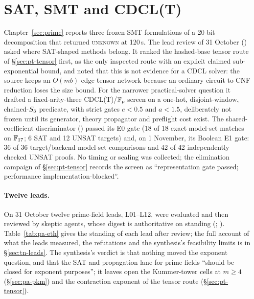 \section{SAT, SMT and CDCL(T)}\label{sec:pa-sat}

Chapter~\ref{sec:prime} reports three frozen SMT formulations of a 20-bit
decomposition that returned \textsc{unknown} at 120\,s. The lead review of
31 October () asked where
SAT-shaped methods belong. It ranked the hashed-base tensor route of
\S\ref{sec:pt-tensor} first, as the only inspected route with an explicit
claimed sub-exponential bound, and noted that this is not evidence for a
CDCL solver: the source keeps an $O(mb)$-edge tensor network because an
ordinary circuit-to-CNF reduction loses the size bound. For the narrower
practical-solver question it drafted a fixed-arity-three CDCL(T)/$\mathbb{F}_p$
screen on a one-hot, disjoint-window, chained-$S_{3}$ predicate, with
strict gates $e<0.5$ and $a<1.5$, deliberately not frozen until its
generator, theory propagator and preflight cost exist. The shared-coefficient
discriminator () passed
its E0 gate (18 of 18 exact model-set matches on $\mathbb{F}_{17}$; 6 SAT and 12
UNSAT targets) and, on 1 November, its Boolean E1 gate: 36 of 36
target/backend model-set comparisons and 42 of 42 independently checked
UNSAT proofs. No timing or scaling was collected; the elimination campaign
of \S\ref{sec:pt-tensor} records the screen as
``representation gate passed; performance implementation-blocked''.

\paragraph{Twelve leads.} On 31 October twelve prime-field leads, L01--L12,
were evaluated and then reviewed by skeptic agents, whose digest is
authoritative on standing (;
).
Table~\ref{tab:pa-eth} gives the standing of each lead after review; the
full account of what the leads measured, the refutations and the
synthesis's feasibility limits is in \S\ref{sec:tn-leads}. The synthesis's
verdict is that nothing moved the exponent question, and that the SAT and
propagation lane for prime fields ``should be closed for exponent
purposes''; it leaves open the Kummer-tower cells at $m\ge4$
(\S\ref{sec:pa-pkm}) and the contraction exponent of the tensor route
(\S\ref{sec:pt-tensor}).

